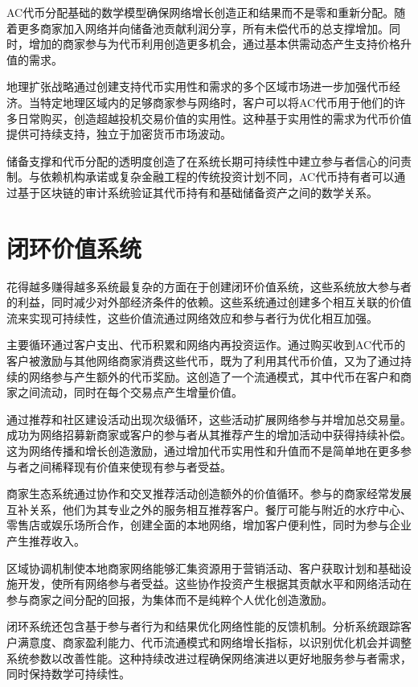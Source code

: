 \documentclass[
  Letterpaper,
]{scrbook}
\begin{document}
AC代币分配基础的数学模型确保网络增长创造正和结果而不是零和重新分配。随着更多商家加入网络并向储备池贡献利润分享，所有未偿代币的总支撑增加。同时，增加的商家参与为代币利用创造更多机会，通过基本供需动态产生支持价格升值的需求。

地理扩张战略通过创建支持代币实用性和需求的多个区域市场进一步加强代币经济。当特定地理区域内的足够商家参与网络时，客户可以将AC代币用于他们的许多日常购买，创造超越投机交易价值的实用性。这种基于实用性的需求为代币价值提供可持续支持，独立于加密货币市场波动。

储备支撑和代币分配的透明度创造了在系统长期可持续性中建立参与者信心的问责制。与依赖机构承诺或复杂金融工程的传统投资计划不同，AC代币持有者可以通过基于区块链的审计系统验证其代币持有和基础储备资产之间的数学关系。

\section{闭环价值系统}\label{ux95edux73afux4ef7ux503cux7cfbux7edf}

花得越多赚得越多系统最复杂的方面在于创建闭环价值系统，这些系统放大参与者的利益，同时减少对外部经济条件的依赖。这些系统通过创建多个相互关联的价值流来实现可持续性，这些价值流通过网络效应和参与者行为优化相互加强。

主要循环通过客户支出、代币积累和网络内再投资运作。通过购买收到AC代币的客户被激励与其他网络商家消费这些代币，既为了利用其代币价值，又为了通过持续的网络参与产生额外的代币奖励。这创造了一个流通模式，其中代币在客户和商家之间流动，同时在每个交易点产生增量价值。

通过推荐和社区建设活动出现次级循环，这些活动扩展网络参与并增加总交易量。成功为网络招募新商家或客户的参与者从其推荐产生的增加活动中获得持续补偿。这为网络传播和增长创造激励，通过增加代币实用性和升值而不是简单地在更多参与者之间稀释现有价值来使现有参与者受益。

商家生态系统通过协作和交叉推荐活动创造额外的价值循环。参与的商家经常发展互补关系，他们为其专业之外的服务相互推荐客户。餐厅可能与附近的水疗中心、零售店或娱乐场所合作，创建全面的本地网络，增加客户便利性，同时为参与企业产生推荐收入。

区域协调机制使本地商家网络能够汇集资源用于营销活动、客户获取计划和基础设施开发，使所有网络参与者受益。这些协作投资产生根据其贡献水平和网络活动在参与商家之间分配的回报，为集体而不是纯粹个人优化创造激励。

闭环系统还包含基于参与者行为和结果优化网络性能的反馈机制。分析系统跟踪客户满意度、商家盈利能力、代币流通模式和网络增长指标，以识别优化机会并调整系统参数以改善性能。这种持续改进过程确保网络演进以更好地服务参与者需求，同时保持数学可持续性。
\end{document}
